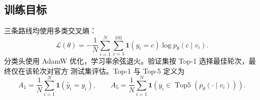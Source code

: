 \subsection{训练目标}

三条路线均使用多类交叉熵：
\begin{equation}
  \mathcal{L}(\theta)
  =-\frac{1}{N}\sum_{i=1}^{N}
  \sum_{c=1}^{101}\mathbf{1}(y_i=c)
  \log p_\theta(c\mid v_i).
  \label{eq:loss}
\end{equation}
分类头使用 AdamW 优化\cite{adamw}，学习率余弦退火。验证集按 Top-1 选择最佳轮次，最终仅在该轮次对官方
测试集评估。Top-1 与 Top-5 定义为
\begin{equation}
  A_1=\frac{1}{N}\sum_{i=1}^{N}
  \mathbf{1}\left(\hat y_i=y_i\right),\qquad
  A_5=\frac{1}{N}\sum_{i=1}^{N}
  \mathbf{1}\left(y_i\in\operatorname{Top5}(p_\theta(\cdot\mid v_i))\right).
  \label{eq:metrics}
\end{equation}
